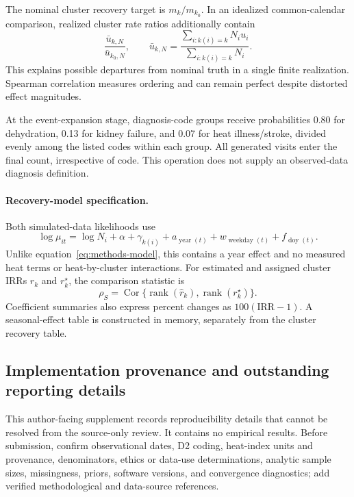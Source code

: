 \documentclass[11pt,letterpaper]{article}
\begin{document}
The nominal cluster recovery target is \(m_k/m_{k_0}\). In an idealized common-calendar comparison, realized cluster rate ratios additionally contain
\begin{equation}
 \frac{\bar u_{k,N}}{\bar u_{k_0,N}},\qquad
 \bar u_{k,N}=\frac{\sum_{i:k(i)=k}N_iu_i}{\sum_{i:k(i)=k}N_i}.
\end{equation}
This explains possible departures from nominal truth in a single finite realization. Spearman correlation measures ordering and can remain perfect despite distorted effect magnitudes.

At the event-expansion stage, diagnosis-code groups receive probabilities 0.80 for dehydration, 0.13 for kidney failure, and 0.07 for heat illness/stroke, divided evenly among the listed codes within each group. All generated visits enter the final count, irrespective of code. This operation does not supply an observed-data diagnosis definition.

\paragraph{Recovery-model specification.}
Both simulated-data likelihoods use
\begin{equation}
 \log\mu_{it}=\log N_i+\alpha+\gamma_{k(i)}
 +a_{\operatorname{year}(t)}+w_{\operatorname{weekday}(t)}+f_{\operatorname{doy}(t)}.
\end{equation}
Unlike equation~\eqref{eq:methods-model}, this contains a year effect and no measured heat terms or heat-by-cluster interactions. For estimated and assigned cluster IRRs \(\widehat r_k\) and \(r_k^\star\), the comparison statistic is
\begin{equation}
 \rho_S=\operatorname{Cor}\{\operatorname{rank}(\widehat r_k),
 \operatorname{rank}(r_k^\star)\}.
\end{equation}
Coefficient summaries also express percent changes as \(100(\mathrm{IRR}-1)\). A seasonal-effect table is constructed in memory, separately from the cluster recovery table.

\subsection{Implementation provenance and outstanding reporting details}
\label{sec:limitations}
This author-facing supplement records reproducibility details that cannot be resolved from the source-only review. It contains no empirical results. Before submission, confirm observational dates, D2 coding, heat-index units and provenance, denominators, ethics or data-use determinations, analytic sample sizes, missingness, priors, software versions, and convergence diagnostics; add verified methodological and data-source references.
\end{document}
